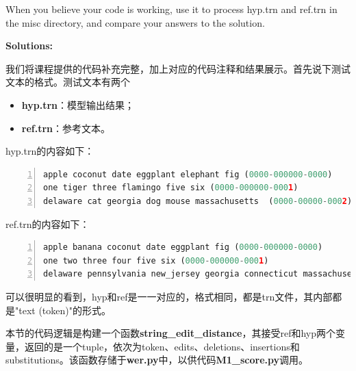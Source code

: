 When you believe your code is working, use it to process hyp.trn and ref.trn in the misc directory, and compare your answers to the solution.

{\bf Solutions:}

我们将课程提供的代码补充完整，加上对应的代码注释和结果展示。首先说下测试文本的格式。测试文本有两个
\begin{itemize}
  \item {\bf hyp.trn}：模型输出结果；
  \item {\bf ref.trn}：参考文本。
\end{itemize}

hyp.trn的内容如下：
\begin{lstlisting}[language = python, numbers=left, 
         numberstyle=\tiny,keywordstyle=\color{blue!70},
         commentstyle=\color{red!50!green!50!blue!50},frame=shadowbox,
         rulesepcolor=\color{red!20!green!20!blue!20},basicstyle=\ttfamily]
apple coconut date eggplant elephant fig (0000-000000-0000)
one tiger three flamingo five six (0000-000000-0001)
delaware cat georgia dog mouse massachusetts  (0000-00000-0002)
\end{lstlisting}

ref.trn的内容如下：
\begin{lstlisting}[language = python, numbers=left, 
         numberstyle=\tiny,keywordstyle=\color{blue!70},
         commentstyle=\color{red!50!green!50!blue!50},frame=shadowbox,
         rulesepcolor=\color{red!20!green!20!blue!20},basicstyle=\ttfamily]
apple banana coconut date eggplant fig (0000-000000-0000)
one two three four five six (0000-000000-0001)
delaware pennsylvania new_jersey georgia connecticut massachusetts  (0000-00000-0002)
\end{lstlisting}

可以很明显的看到，hyp和ref是一一对应的，格式相同，都是trn文件，其内部都是"text (token)"的形式。

本节的代码逻辑是构建一个函数{\bf string\_edit\_distance}，其接受ref和hyp两个变量，返回的是一个tuple，依次为token、edits、deletions、insertions和substitutions。该函数存储于{\bf wer.py}中，以供代码{\bf M1\_score.py}调用。

